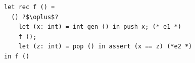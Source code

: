 \begin{example}
  \begin{verbatim}
let rec f () =
  () ?$\oplus$?
    let (x: int) = int_gen () in push x; (* e1 *)
    f ();
    let (z: int) = pop () in assert (x == z) (*e2 *)
in f ()
  \end{verbatim}
\end{example}
